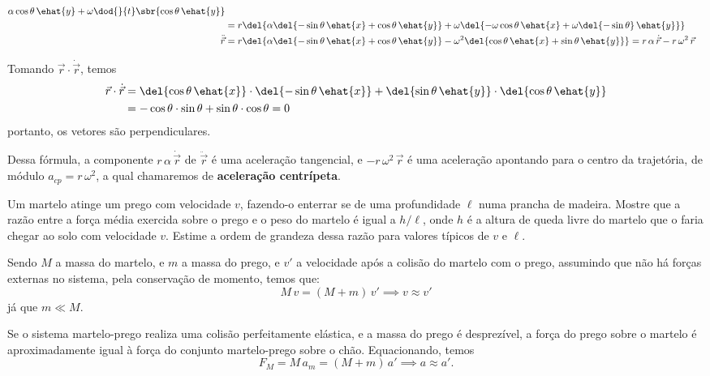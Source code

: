 \documentclass[]{IMTexam}
\begin{document}
\begin{questions}
\begin{solution}
\begin{align*}
{			\alpha\cos\theta\, \ehat{y}+\omega\dod{}{t}\sbr{\cos\theta\, \ehat{y}}}                                                                                                                       \\
			               & =r\del{\alpha\del{-\sin\theta\, \ehat{x}+\cos\theta\, \ehat{y}}+\omega\del{-\omega\cos\theta\, \ehat{x}+\omega\del{-\sin\theta}\, \ehat{y}}}                                 \\
			\ddot{\vec{r}} & =r\del{\alpha\del{-\sin\theta\, \ehat{x}+\cos\theta\, \ehat{y}}-\omega^{2}\del{\cos\theta\, \ehat{x}+\sin\theta\, \ehat{y}}}=r\,\alpha\,\dot{\vec{r}}-r\,\omega^{2}\,\vec{r}
		\end{align*}

		Tomando $ \vec{r}\cdot\dot{\vec{r}} $, temos
		\begin{align*}
			\vec{r}\cdot\dot{\vec{r}} & =\del{\cos\theta\,\ehat{x}}\cdot\del{-\sin\theta\, \ehat{x}}+\del{\sin\theta\, \ehat{y}}\cdot\del{\cos\theta\, \ehat{y}} \\
			                          & =-\cos\theta\cdot\sin\theta+\sin\theta\cdot\cos\theta=0
		\end{align*}
		portanto, os vetores são perpendiculares.

		Dessa fórmula, a componente $ r\,\alpha\,\dot{\vec{r}} $ de $ \ddot{\vec{r}} $ é uma aceleração tangencial, e $ -r\,\omega^{2}\,\vec{r} $ é uma aceleração apontando para o centro da trajetória, de módulo $ a_{cp}=r\,\omega^{2} $, a qual chamaremos de \textbf{aceleração centrípeta}.
	\end{solution}

	\clearpage

	\question
	Um martelo atinge um prego com velocidade $ v $, fazendo-o enterrar se de uma profundidade $\ell$ numa prancha de madeira. Mostre que a razão entre a força média exercida sobre o prego e o peso do martelo é igual a $h/\ell$, onde $ h $ é a altura de queda livre do martelo que o faria chegar ao solo com velocidade $ v $. Estime a ordem de grandeza dessa razão para valores típicos de $ v $ e $\ell$.

	\begin{solution}
		Sendo $ M $ a massa do martelo, e $ m $ a massa do prego, e $ v' $ a velocidade após a colisão do martelo com o prego, assumindo que não há forças externas no sistema, pela conservação de momento, temos que:
		\[ M\,v=(M+m)\,v'\implies v\approx v'  \]
		já que $ m\ll M $.

		Se o sistema martelo-prego realiza uma colisão perfeitamente elástica, e a massa do prego é desprezível, a força do prego sobre o martelo é aproximadamente igual à força do conjunto martelo-prego sobre o chão. Equacionando, temos
		\begin{equation}\label{eq:hammerFnailS}
			F_M=M\,a_m=(M+m)\,a'\implies a\approx a'.
		\end{equation}


\end{solution}
\end{questions}
\end{document}
